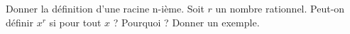 %
%
\begin{tasks}
	\task Donner la définition d'une racine n-ième.
	\task Soit $r$ un nombre rationnel. Peut-on définir $x^r$ si pour tout $x$ ?
	\task Pourquoi ? Donner un exemple.
\end{tasks}
